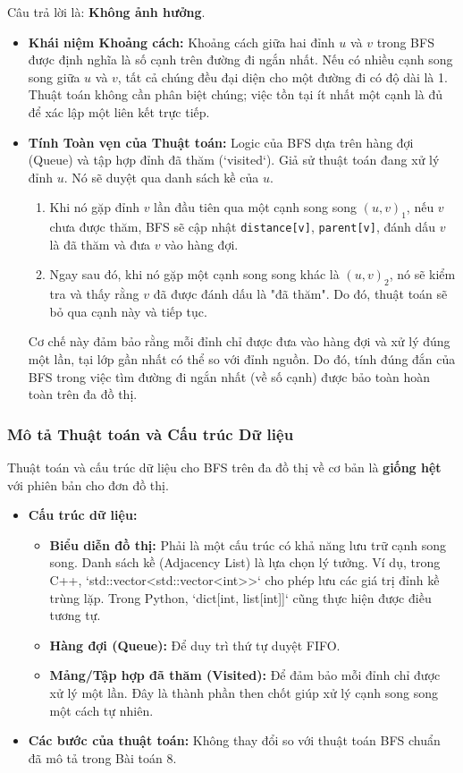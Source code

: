 \documentclass[a4paper,12pt]{article}
\begin{document}
Câu trả lời là: \textbf{Không ảnh hưởng}.
\begin{itemize}
    \item \textbf{Khái niệm Khoảng cách:} Khoảng cách giữa hai đỉnh $u$ và $v$ trong BFS được định nghĩa là số cạnh trên đường đi ngắn nhất. Nếu có nhiều cạnh song song giữa $u$ và $v$, tất cả chúng đều đại diện cho một đường đi có độ dài là 1. Thuật toán không cần phân biệt chúng; việc tồn tại ít nhất một cạnh là đủ để xác lập một liên kết trực tiếp.
    \item \textbf{Tính Toàn vẹn của Thuật toán:} Logic của BFS dựa trên hàng đợi (Queue) và tập hợp đỉnh đã thăm (`visited`). Giả sử thuật toán đang xử lý đỉnh $u$. Nó sẽ duyệt qua danh sách kề của $u$.
    \begin{enumerate}
        \item Khi nó gặp đỉnh $v$ lần đầu tiên qua một cạnh song song $(u,v)_1$, nếu $v$ chưa được thăm, BFS sẽ cập nhật \texttt{distance[v]}, \texttt{parent[v]}, đánh dấu $v$ là đã thăm và đưa $v$ vào hàng đợi.
        \item Ngay sau đó, khi nó gặp một cạnh song song khác là $(u,v)_2$, nó sẽ kiểm tra và thấy rằng $v$ đã được đánh dấu là "đã thăm". Do đó, thuật toán sẽ bỏ qua cạnh này và tiếp tục.
    \end{enumerate}
    Cơ chế này đảm bảo rằng mỗi đỉnh chỉ được đưa vào hàng đợi và xử lý đúng một lần, tại lớp gần nhất có thể so với đỉnh nguồn. Do đó, tính đúng đắn của BFS trong việc tìm đường đi ngắn nhất (về số cạnh) được bảo toàn hoàn toàn trên đa đồ thị.
\end{itemize}

\subsubsection{Mô tả Thuật toán và Cấu trúc Dữ liệu}
Thuật toán và cấu trúc dữ liệu cho BFS trên đa đồ thị về cơ bản là \textbf{giống hệt} với phiên bản cho đơn đồ thị.
\begin{itemize}
    \item \textbf{Cấu trúc dữ liệu:}
        \begin{itemize}
            \item \textbf{Biểu diễn đồ thị:} Phải là một cấu trúc có khả năng lưu trữ cạnh song song. Danh sách kề (Adjacency List) là lựa chọn lý tưởng. Ví dụ, trong C++, `std::vector<std::vector<int>>` cho phép lưu các giá trị đỉnh kề trùng lặp. Trong Python, `dict[int, list[int]]` cũng thực hiện được điều tương tự.
            \item \textbf{Hàng đợi (Queue):} Để duy trì thứ tự duyệt FIFO.
            \item \textbf{Mảng/Tập hợp đã thăm (Visited):} Để đảm bảo mỗi đỉnh chỉ được xử lý một lần. Đây là thành phần then chốt giúp xử lý cạnh song song một cách tự nhiên.
        \end{itemize}
    \item \textbf{Các bước của thuật toán:} Không thay đổi so với thuật toán BFS chuẩn đã mô tả trong Bài toán 8.
\end{itemize}
\end{document}
